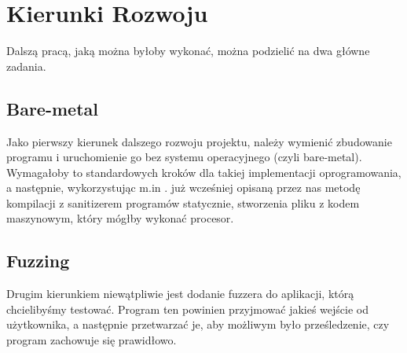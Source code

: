 \documentclass[../main.tex]{subfiles}
\begin{document}
	
	
	\section{Kierunki Rozwoju}
Dalszą pracą, jaką można byłoby wykonać, można podzielić na dwa główne zadania.

		\subsection{Bare-metal}
 Jako pierwszy kierunek dalszego rozwoju projektu, należy wymienić zbudowanie programu i uruchomienie go bez systemu operacyjnego (czyli bare-metal). Wymagałoby to standardowych kroków dla takiej implementacji oprogramowania, a następnie, wykorzystując m.in . już wcześniej opisaną przez nas metodę kompilacji z sanitizerem programów statycznie, stworzenia pliku z kodem maszynowym, który mógłby wykonać procesor.



		\subsection{Fuzzing}
		Drugim kierunkiem niewątpliwie jest dodanie fuzzera do aplikacji, którą chcielibyśmy testować. Program ten powinien przyjmować jakieś wejście od użytkownika, a następnie przetwarzać je, aby możliwym było prześledzenie, czy program zachowuje się prawidłowo.
\end{document}
